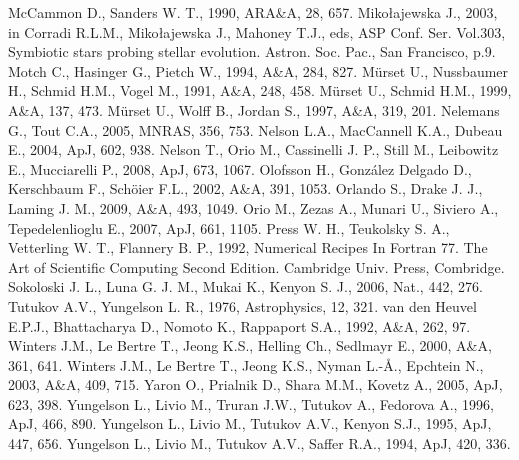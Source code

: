 \documentclass{elsart}
\begin{document}
\begin{thebibliography}{}
McCammon D., Sanders W. T., 1990, ARA\&A, 28, 657.
Miko{\l}ajewska J., 2003, in Corradi R.L.M., Miko{\l}ajewska J.,
Mahoney T.J., eds, ASP Conf. Ser. Vol.303, Symbiotic stars probing
stellar evolution. Astron. Soc. Pac., San Francisco, p.9.
Motch C., Hasinger G., Pietch W., 1994, A\&A, 284, 827.
M\"{u}rset U., Nussbaumer H., Schmid H.M., Vogel M., 1991, A\&A,
248, 458.
M\"{u}rset U., Schmid H.M., 1999, A\&A, 137, 473.
M\"{u}rset U., Wolff B., Jordan S., 1997, A\&A, 319, 201.
Nelemans G., Tout C.A., 2005, MNRAS, 356, 753.
Nelson L.A., MacCannell K.A., Dubeau E., 2004, ApJ, 602, 938.
Nelson T., Orio M., Cassinelli
J. P., Still M., Leibowitz E., Mucciarelli P., 2008, ApJ, 673, 1067.
Olofsson H., Gonz\'{a}lez Delgado D., Kerschbaum F., Sch\"{o}ier
F.L., 2002, A\&A, 391, 1053.
Orlando S., Drake J. J., Laming
J. M., 2009, A\&A, 493, 1049.
Orio M., Zezas A., Munari U., Siviero A., Tepedelenlioglu E., 2007,
ApJ, 661, 1105.
Press W. H., Teukolsky S. A., Vetterling W. T.,
Flannery B. P., 1992, Numerical Recipes In Fortran 77. The Art of
Scientific Computing Second Edition. Cambridge Univ. Press,
Combridge.
Sokoloski J. L., Luna G. J.
M., Mukai K., Kenyon S. J., 2006, Nat., 442, 276.
Tutukov A.V.,
Yungelson L. R., 1976, Astrophysics, 12, 321.
van den Heuvel E.P.J., Bhattacharya D., Nomoto K., Rappaport S.A.,
1992, A\&A, 262, 97.
Winters J.M., Le Bertre T., Jeong K.S., Helling Ch., Sedlmayr E.,
2000, A\&A, 361, 641.
Winters J.M., Le Bertre T., Jeong K.S., Nyman L.-\AA., Epchtein N.,
2003, A\&A, 409, 715.
Yaron O., Prialnik D., Shara M.M., Kovetz A., 2005, ApJ, 623, 398.
Yungelson L., Livio M., Truran J.W., Tutukov A., Fedorova A., 1996,
ApJ, 466, 890.
Yungelson L., Livio M., Tutukov A.V., Kenyon S.J., 1995, ApJ, 447,
656.
Yungelson L., Livio M., Tutukov A.V., Saffer R.A., 1994, ApJ, 420,
336.
\end{thebibliography}
\end{document}
